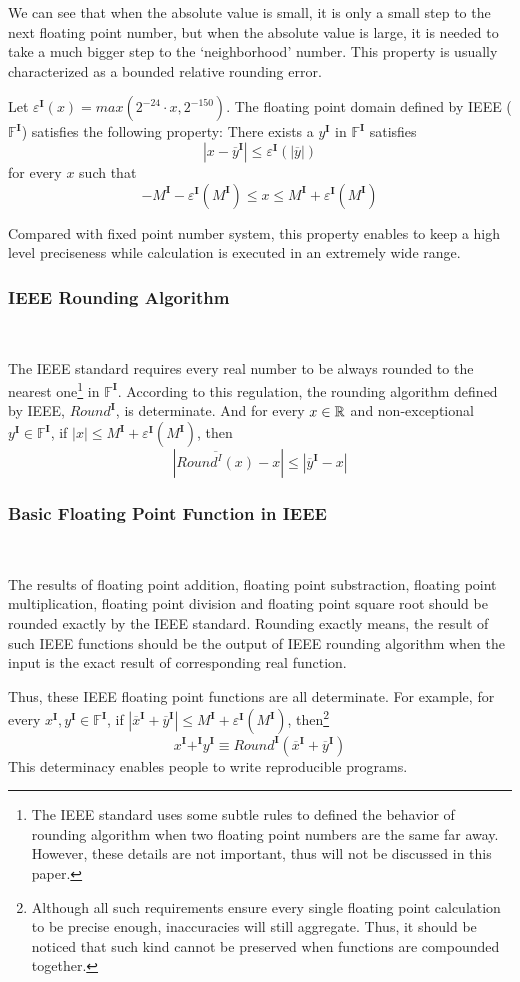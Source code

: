 \documentclass[12pt]{article}
\newcommand{\F}{\mathbb{F}}
\newcommand{\IEEE}{\mathbf{I}}
\newcommand{\OL}{\overline}
\begin{document}
We can see that when the absolute value is small, it is only a small step to the next floating point number, but when the absolute value is large, it is needed to take a much bigger step to the `neighborhood' number. This property is usually characterized as a bounded relative rounding error.

Let $\varepsilon^\IEEE(x) = max(2^{-24} \cdot x, 2^{-150})$. The floating point domain defined by IEEE ($\F ^ \IEEE$) satisfies the following property: There exists a $y^\IEEE$ in $\F^\IEEE$ satisfies $$|x - \OL y^\IEEE| \leq \varepsilon^\IEEE(|\OL y|) $$ for every $x$ such that $$- M^\IEEE - \varepsilon^\IEEE(M^\IEEE) \leq x \leq  M^\IEEE + \varepsilon^\IEEE(M^\IEEE)$$

Compared with fixed point number system, this property enables to keep a high level preciseness while calculation is executed in an extremely wide range.

\subsubsection{IEEE Rounding Algorithm} \

The IEEE standard requires every real number to be always rounded to the nearest one\footnote{The IEEE standard uses some subtle rules to defined the behavior of rounding algorithm when two floating point numbers are the same far away. However, these details are not important, thus will not be discussed in this paper.} in $\F^\IEEE$. According to this regulation, the rounding algorithm defined by IEEE, $Round^\mathbf{I}$, is determinate. And for every $x \in \mathbb{R}$ and non-exceptional $y^\IEEE \in \F^\IEEE$, if $|x|\leq M^\IEEE + \varepsilon^\IEEE(M^\IEEE)$, then
$$ \left|\OL{Round^I(x)} - x \right| \leq |\OL y^\IEEE-x| $$

\subsubsection{Basic Floating Point Function in IEEE} \

The results of floating point addition, floating point substraction, floating point multiplication, floating point division and floating point square root should be rounded exactly by the IEEE standard. Rounding exactly means, the result of such IEEE functions should be the output of IEEE rounding algorithm when the input is the exact result of corresponding real function.

Thus, these IEEE floating point functions are all determinate. For example, for every $x^\IEEE, y^\IEEE \in \F^\IEEE$, if $\left| \OL x^\IEEE + \OL y^\IEEE\right| \leq M^\IEEE + \varepsilon^\IEEE(M^\IEEE)$, then\footnote{Although all such requirements ensure every single floating point calculation to be precise enough, inaccuracies will still aggregate. Thus, it should be noticed that such kind cannot be preserved when functions are compounded together.} $$x^\IEEE +^\IEEE y^\IEEE \equiv Round^\mathbf{I}(\OL x^\IEEE + \OL y^\IEEE)$$
This determinacy enables people to write reproducible programs.
\end{document}

